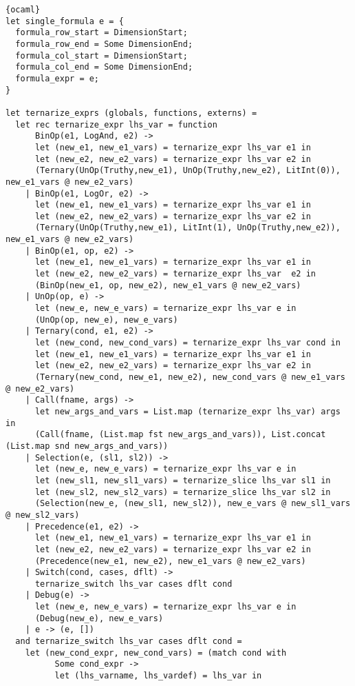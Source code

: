 \begin{lstlisting}{ocaml}
let single_formula e = {
  formula_row_start = DimensionStart;
  formula_row_end = Some DimensionEnd;
  formula_col_start = DimensionStart;
  formula_col_end = Some DimensionEnd;
  formula_expr = e;
}

let ternarize_exprs (globals, functions, externs) =
  let rec ternarize_expr lhs_var = function
      BinOp(e1, LogAnd, e2) ->
      let (new_e1, new_e1_vars) = ternarize_expr lhs_var e1 in
      let (new_e2, new_e2_vars) = ternarize_expr lhs_var e2 in
      (Ternary(UnOp(Truthy,new_e1), UnOp(Truthy,new_e2), LitInt(0)), new_e1_vars @ new_e2_vars)
    | BinOp(e1, LogOr, e2) ->
      let (new_e1, new_e1_vars) = ternarize_expr lhs_var e1 in
      let (new_e2, new_e2_vars) = ternarize_expr lhs_var e2 in
      (Ternary(UnOp(Truthy,new_e1), LitInt(1), UnOp(Truthy,new_e2)), new_e1_vars @ new_e2_vars)
    | BinOp(e1, op, e2) ->
      let (new_e1, new_e1_vars) = ternarize_expr lhs_var e1 in
      let (new_e2, new_e2_vars) = ternarize_expr lhs_var  e2 in
      (BinOp(new_e1, op, new_e2), new_e1_vars @ new_e2_vars)
    | UnOp(op, e) ->
      let (new_e, new_e_vars) = ternarize_expr lhs_var e in
      (UnOp(op, new_e), new_e_vars)
    | Ternary(cond, e1, e2) ->
      let (new_cond, new_cond_vars) = ternarize_expr lhs_var cond in
      let (new_e1, new_e1_vars) = ternarize_expr lhs_var e1 in
      let (new_e2, new_e2_vars) = ternarize_expr lhs_var e2 in
      (Ternary(new_cond, new_e1, new_e2), new_cond_vars @ new_e1_vars @ new_e2_vars)
    | Call(fname, args) ->
      let new_args_and_vars = List.map (ternarize_expr lhs_var) args in
      (Call(fname, (List.map fst new_args_and_vars)), List.concat (List.map snd new_args_and_vars))
    | Selection(e, (sl1, sl2)) ->
      let (new_e, new_e_vars) = ternarize_expr lhs_var e in
      let (new_sl1, new_sl1_vars) = ternarize_slice lhs_var sl1 in
      let (new_sl2, new_sl2_vars) = ternarize_slice lhs_var sl2 in
      (Selection(new_e, (new_sl1, new_sl2)), new_e_vars @ new_sl1_vars @ new_sl2_vars)
    | Precedence(e1, e2) ->
      let (new_e1, new_e1_vars) = ternarize_expr lhs_var e1 in
      let (new_e2, new_e2_vars) = ternarize_expr lhs_var e2 in
      (Precedence(new_e1, new_e2), new_e1_vars @ new_e2_vars)
    | Switch(cond, cases, dflt) ->
      ternarize_switch lhs_var cases dflt cond
    | Debug(e) ->
      let (new_e, new_e_vars) = ternarize_expr lhs_var e in
      (Debug(new_e), new_e_vars)
    | e -> (e, [])
  and ternarize_switch lhs_var cases dflt cond =
    let (new_cond_expr, new_cond_vars) = (match cond with
          Some cond_expr ->
          let (lhs_varname, lhs_vardef) = lhs_var in

\end{lstlisting}
